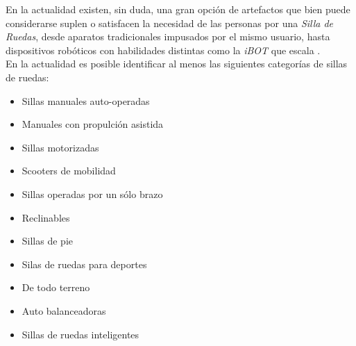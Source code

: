 En la actualidad existen, sin duda, una gran opci\'on de artefactos que bien puede
considerarse suplen o satisfacen la necesidad de las personas por una
\emph{Silla de Ruedas}, desde aparatos tradicionales impusados por el mismo
usuario, hasta dispositivos rob\'oticos con habilidades distintas como la
\emph{iBOT} que escala \parencite{ibot}.\\
En la actualidad es posible identificar al menos las siguientes categor\'ias de
sillas de ruedas:
\begin{itemize}
    \item Sillas manuales auto-operadas
    \item Manuales con propulci\'on asistida
    \item Sillas motorizadas
    \item Scooters de mobilidad
    \item Sillas operadas por un s\'olo brazo
    \item Reclinables
    \item Sillas de pie
    \item Silas de ruedas para deportes
    \item De todo terreno
    \item Auto balanceadoras
    \item Sillas de ruedas inteligentes
\end{itemize}

